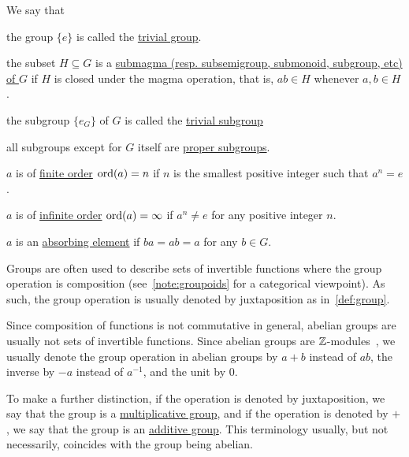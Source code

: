 \begin{definition}
  We say that
  \begin{defenum}
    \item\label{def:group/trivial_group} the group $\{ e \}$ is called the \uline{trivial group}.
    \item\label{def:group/subgroup} the subset $H \subseteq G$ is a \uline{submagma (resp. subsemigroup, submonoid, subgroup, etc) of $G$} if $H$ is closed under the magma operation, that is, $ab \in H$ whenever $a, b \in H$.
    \item\label{def:group/trivial_subgroup} the subgroup $\{ e_G \}$ of $G$ is called the \uline{trivial subgroup}
    \item\label{def:group/proper_subgroup} all subgroups except for $G$ itself are \uline{proper subgroups}.
    \item\label{def:group/finite_order} $a$ is of \uline{finite order} $\operatorname{ord}(a) = n$ if $n$ is the smallest positive integer such that $a^n = e$.
    \item\label{def:group/infinite_order} $a$ is of \uline{infinite order} $\operatorname{ord}(a) = \infty$ if $a^n \neq e$ for any positive integer $n$.
    \item\label{def:group/absorbing_element} $a$ is an \uline{absorbing element} if $ba = ab = a$ for any $b \in G$.
  \end{defenum}
\end{definition}

\begin{note}\label{note:additive_group}
  Groups are often used to describe sets of invertible functions where the group operation is composition (see~\cref{note:groupoids} for a categorical viewpoint). As such, the group operation is usually denoted by juxtaposition as in~\cref{def:group}.

  Since composition of functions is not commutative in general, abelian groups are usually not sets of invertible functions. Since abelian groups are $\mathbb Z$-modules~, we usually denote the group operation in abelian groups by $a + b$ instead of $ab$, the inverse by $-a$ instead of $a^{-1}$, and the unit by $0$.

  To make a further distinction, if the operation is denoted by juxtaposition, we say that the group is a \uline{multiplicative group}, and if the operation is denoted by $+$, we say that the group is an \uline{additive group}. This terminology usually, but not necessarily, coincides with the group being abelian.
\end{note}

